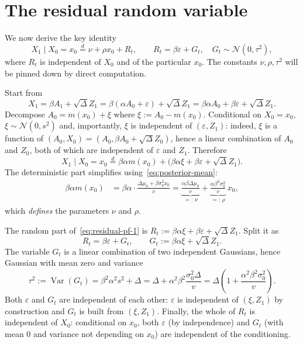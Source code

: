 \documentclass[11pt,a4paper,openany]{book}
\theoremstyle{plainserif}
\theoremstyle{definition}
\theoremstyle{remarkstyle}
\newcommand{\V}{\operatorname{Var}}
\newcommand{\Normal}{\mathcal{N}}
\begin{document}
\section{The residual random variable}
\label{sec:residual-setup}

We now derive the key identity
\begin{equation}
X_1 \mid X_0 = x_0 \stackrel{d}{=} \nu + \rho x_0 + R_t,
\qquad
R_t = \beta\varepsilon + G_t,\quad G_t \sim \Normal(0, \tau^2),
\label{eq:residual}
\end{equation}
where $R_t$ is independent of $X_0$ and of the particular $x_0$. The
constants $\nu, \rho, \tau^2$ will be pinned down by direct computation.

Start from
\[
X_1 = \beta A_1 + \sqrt{\Delta}Z_1 = \beta(\alpha A_0 + \varepsilon) + \sqrt{\Delta}Z_1
    = \beta\alpha A_0 + \beta\varepsilon + \sqrt{\Delta}Z_1.
\]
Decompose $A_0 = m(x_0) + \xi$ where $\xi := A_0 - m(x_0)$. Conditional on
$X_0 = x_0$, $\xi \sim \Normal(0, s^2)$ and, importantly, $\xi$ is
independent of $(\varepsilon, Z_1)$: indeed, $\xi$ is a function of
$(A_0, X_0) = (A_0, \beta A_0 + \sqrt{\Delta}Z_0)$, hence a linear combination
of $A_0$ and $Z_0$, both of which are independent of $\varepsilon$ and $Z_1$.
Therefore
\begin{equation}
X_1 \mid X_0 = x_0 \stackrel{d}{=} \beta\alpha m(x_0) + \bigl(\beta\alpha \xi + \beta\varepsilon
                    + \sqrt{\Delta}Z_1\bigr).
\label{eq:residual-pf-1}
\end{equation}
The deterministic part simplifies using~\eqref{eq:posterior-mean}:
\begin{align}
\beta\alpha m(x_0)
 &= \beta\alpha\cdot \frac{\Delta\mu_0 + \beta\sigma_0^2 x_0}{v}
  = \underbrace{\frac{\alpha\beta\Delta\mu_0}{v}}_{=:\, \nu}
    + \underbrace{\frac{\alpha\beta^2\sigma_0^2}{v}}_{=:\, \rho}\, x_0,
\label{eq:nu-rho}
\end{align}
which \emph{defines} the parameters $\nu$ and $\rho$.

The random part of~\eqref{eq:residual-pf-1} is
$R_t := \beta\alpha\xi + \beta\varepsilon + \sqrt{\Delta}Z_1$.
Split it as
\[
R_t = \beta\varepsilon + G_t, \qquad
G_t := \beta\alpha\xi + \sqrt{\Delta}Z_1.
\]
The variable $G_t$ is a linear combination of two independent Gaussians,
hence Gaussian with mean zero and variance
\begin{equation}
\tau^2 := \V(G_t) = \beta^2\alpha^2 s^2 + \Delta
       = \Delta + \alpha^2\beta^2\frac{\sigma_0^2\Delta}{v}
       = \Delta\left(1 + \frac{\alpha^2\beta^2\sigma_0^2}{v}\right).
\label{eq:tau2-derivation}
\end{equation}
Both $\varepsilon$ and $G_t$ are independent of each other: $\varepsilon$
is independent of $(\xi, Z_1)$ by construction and $G_t$ is built from
$(\xi, Z_1)$. Finally, the whole of $R_t$ is independent of $X_0$:
conditional on $x_0$, both $\varepsilon$ (by independence) and $G_t$ (with
mean $0$ and variance not depending on $x_0$) are independent of the
conditioning.
\end{document}
